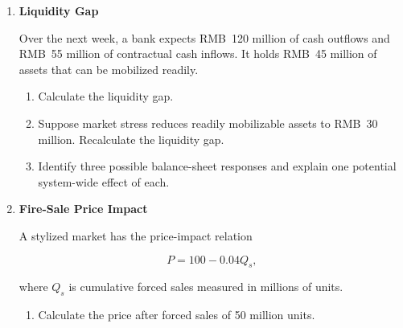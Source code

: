 \begin{enumerate}
A bank has RMB~1,000 million of assets and RMB~80 million of equity.

\begin{enumerate}

\item Calculate the initial capital ratio.

\item The bank recognizes RMB~25 million of asset losses. Calculate its post-loss assets and equity.

\item If the bank seeks to restore an 8\% capital ratio without raising new equity, calculate the asset level consistent with the target using Equation~\eqref{eq:ch21-capital-constrained-assets}.

\item Calculate the required reduction in assets and explain how such adjustment could affect borrowers.

\end{enumerate}


\item \textbf{Liquidity Gap}

Over the next week, a bank expects RMB~120 million of cash outflows and RMB~55 million of contractual cash inflows. It holds RMB~45 million of assets that can be mobilized readily.

\begin{enumerate}

\item Calculate the liquidity gap.

\item Suppose market stress reduces readily mobilizable assets to RMB~30 million. Recalculate the liquidity gap.

\item Identify three possible balance-sheet responses and explain one potential system-wide effect of each.

\end{enumerate}


\item \textbf{Fire-Sale Price Impact}

A stylized market has the price-impact relation

\[
P=100-0.04Q_s,
\]

where \(Q_s\) is cumulative forced sales measured in millions of units.

\begin{enumerate}

\item Calculate the price after forced sales of 50 million units.


\end{enumerate}
\end{enumerate}
